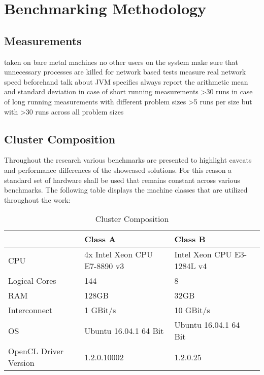 \chapter{Benchmarking Methodology}
\label{benchmarking_methodology}
\section{Measurements}


taken on bare metal machines
no other users on the system
make sure that unnecessary processes are killed
for network based tests measure real network speed beforehand
talk about JVM specifics
always report the arithmetic mean and standard deviation
in case of short running measurements >30 runs
in case of long running measurements with different problem sizes >5 runs per size but with >30 runs across all problem sizes

\section{Cluster Composition}
\label{cluster_composition}
Throughout the research various benchmarks are presented to highlight caveats and performance differences of the showcased solutions. For this reason a standard set of hardware shall be used that remains constant across various benchmarks. The following table displays the machine classes that are utilized throughout the work:

\begin{table}[htb]
	\centering
	\begin{adjustbox}{width=1\textwidth}
		\small
		\begin{tabular}{l | l | l | l}
			~                     & Class A                  	& Class B                  \\
			\hline
			CPU                   &  4x Intel Xeon CPU E7-8890 v3 	& Intel Xeon CPU E3-1284L v4 \\
			Logical Cores         &  144 	& 8 \\
			RAM                   &  128GB                       	& 32GB                       \\
			Interconnect          &  1 GBit/s                  	& 10 GBit/s                  \\
			OS                    &  Ubuntu 16.04.1 64 Bit      	& Ubuntu 16.04.1 64 Bit      \\
			OpenCL Driver Version &  1.2.0.10002                   & 1.2.0.25                   \\
		\end{tabular}
	\end{adjustbox}
	
	\caption{Cluster Composition}
	\label{table:cluster_setup_1}
\end{table}

